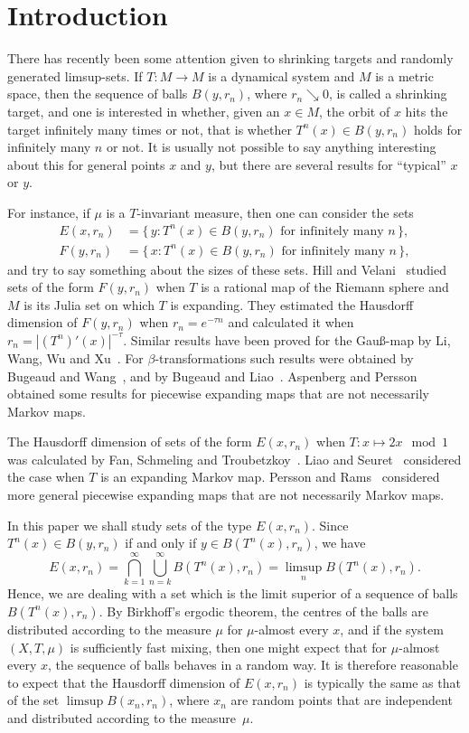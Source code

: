 \documentclass[11pt]{article}
\theoremstyle{definition}
\numberwithin{equation}{section}
\numberwithin{figure}{section}
\numberwithin{table}{section}
\begin{document}
\section{Introduction}

There has recently been some attention given to shrinking targets and randomly generated limsup-sets. If $T \colon M \to M$ is a dynamical system and $M$ is a metric space, then the sequence of balls $B(y,r_n)$, where $r_n \searrow 0$, is called a shrinking target, and one is interested in whether, given an $x \in M$, the orbit of $x$ hits the target infinitely many times or not, that is whether $T^n(x)
\in B(y,r_n)$ holds for infinitely many $n$ or not. It is usually not possible to say anything interesting about this for general points $x$ and $y$, but there are several results for ``typical'' $x$ or $y$.

For instance, if $\mu$ is a $T$-invariant measure, then one can consider the sets
\begin{align*}
E (x,r_n) &= \{\, y : T^n (x) \in B(y,r_n) \text{ for infinitely many } n \,\},\\ F (y,r_n) &= \{\, x : T^n (x) \in B(y,r_n) \text{ for infinitely many } n \,\},
\end{align*}
and try to say something about the sizes of these sets. Hill and Velani~\cite{hillvelani} studied sets of the form $F(y, r_n)$ when $T$ is a rational map of the Riemann sphere and $M$ is its Julia set on which $T$ is expanding. They estimated the Hausdorff dimension of $F(y,r_n)$ when $r_n = e^{-\tau n}$ and calculated it when $r_n = |(T^n)' (x)|^{-\tau}$. Similar results have been proved for the Gau\ss-map by Li, Wang, Wu and Xu~\cite{liwangwuxu}. For $\beta$-transformations such results were obtained by Bugeaud and Wang~\cite{bugeaudwang}, and by Bugeaud and Liao~\cite{bugeaudliao}. Aspenberg and Persson~\cite{aspenbergpersson} obtained some results for piecewise expanding maps that are not necessarily Markov maps.

The Hausdorff dimension of sets of the form $E(x,r_n)$ when $T \colon x \mapsto 2x \mod 1$ was calculated by Fan, Schmeling and Troubetzkoy~\cite{fanschmelingtroubetzkoy}. Liao and Seuret~\cite{liaoseuret} considered the case when $T$ is an expanding Markov map. Persson and Rams~\cite{perssonrams} considered more general piecewise expanding maps that are not necessarily Markov maps.

In this paper we shall study sets of the type $E (x,r_n)$. Since $T^n (x) \in B(y,r_n)$ if and only if $y \in B(T^n(x),r_n)$, we have
\[
E(x,r_n) = \bigcap_{k=1}^\infty \bigcup_{n=k}^\infty B(T^n(x),r_n) =
\limsup_n B(T^n(x),r_n).
\]
Hence, we are dealing with a set which is the limit superior of a sequence of balls $B(T^n(x),r_n)$. By Birkhoff's ergodic theorem, the centres of the balls are distributed according to the measure $\mu$ for $\mu$-almost every $x$, and if the system $(X,T,\mu)$ is sufficiently fast mixing, then one might expect that for $\mu$-almost every $x$, the sequence of balls behaves in a random way. It is therefore reasonable to expect that the Hausdorff dimension of $E(x,r_n)$ is typically the same as that of the set $\limsup B(x_n,r_n)$, where $x_n$ are random points that are independent and distributed according to the measure~$\mu$.
\end{document}
